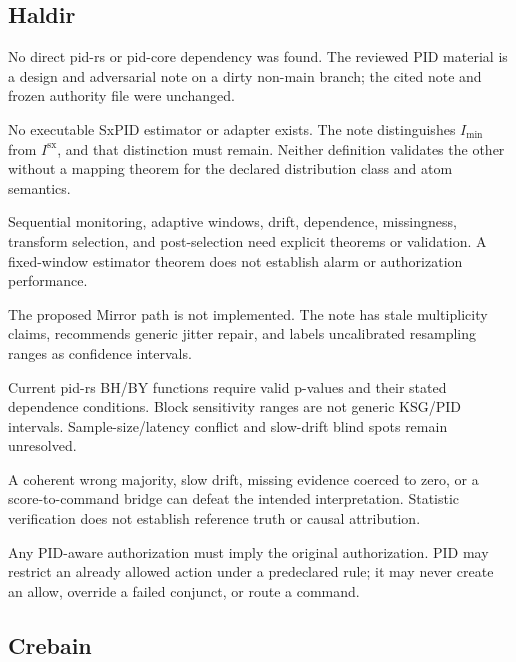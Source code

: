 \documentclass[11pt]{article}
\newcommand{\Sx}{I^{\mathrm{sx}}}
\newcommand{\Imin}{I_{\min}}
\begin{document}
\subsection{Haldir}

\begin{description}[style=nextline,font=\bfseries]
\item[Provenance] No direct pid-rs or pid-core dependency was found.  The
reviewed PID material is a design and adversarial note on a dirty non-main
branch; the cited note and frozen authority file were unchanged.
\item[SxPID estimand compatibility] No executable SxPID estimator or adapter
exists.  The note distinguishes $\Imin$ from $\Sx$, and that distinction must
remain.  Neither definition validates the other without a mapping theorem for
the declared distribution class and atom semantics.
\item[Mathematical assumptions] Sequential monitoring, adaptive windows, drift,
dependence, missingness, transform selection, and post-selection need explicit
theorems or validation.  A fixed-window estimator theorem does not establish
alarm or authorization performance.
\item[Implementation and API] The proposed Mirror path is not implemented.  The
note has stale multiplicity claims, recommends generic jitter repair, and labels
uncalibrated resampling ranges as confidence intervals.
\item[Numerical and statistical validity] Current pid-rs BH/BY functions require
valid p-values and their stated dependence conditions.  Block sensitivity ranges
are not generic KSG/PID intervals.  Sample-size/latency conflict and slow-drift
blind spots remain unresolved.
\item[Adversarial and operational misuse] A coherent wrong majority, slow drift,
missing evidence coerced to zero, or a score-to-command bridge can defeat the
intended interpretation.  Statistic verification does not establish reference
truth or causal attribution.
\item[Authority] Any PID-aware authorization must imply the original
authorization.  PID may restrict an already allowed action under a predeclared
rule; it may never create an allow, override a failed conjunct, or route a command.
\end{description}

\subsection{Crebain}
\end{document}
